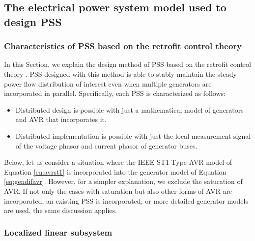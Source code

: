\documentclass[tombow,dvipdfmx]{corona-a5-1.1}
\begin{document}
\subsection{The electrical power system model used to design PSS\advanced}

\smallskip
\subsubsection{Characteristics of PSS based on the retrofit control theory}

In this Section, we explain the design method of PSS based on the retrofit control theory \cite{ishizaki2018retrofit,sadamoto2018retrofit,sasahara2019damping,ishizaki2019retrofit,ishizaki2021modularity}.
PSS designed with this method is able to stably maintain the steady power flow distribution of interest even when multiple generators are incorporated in parallel.
Specifically, each PSS is characterized as follows:
\begin{itemize}
\item Distributed design is possible with just a mathematical model of generators and AVR that incorporates it.
\item Distributed implementation is possible with just the local measurement signal of the voltage phasor and current phasor of generator buses.
\end{itemize}
Below, let us consider a situation where the IEEE ST1 Type AVR model of Equation \ref{eq:avrst1} is incorporated into the generator model of Equation \ref{eq:gendifavr}.
However, for a simpler explanation, we exclude the saturation of AVR.
If not only the cases with saturation but also other forms of AVR are incorporated, an existing PSS is incorporated, or more detailed generator models are used, the same discussion applies.

\smallskip
\subsubsection{Localized linear subsystem}
\end{document}
